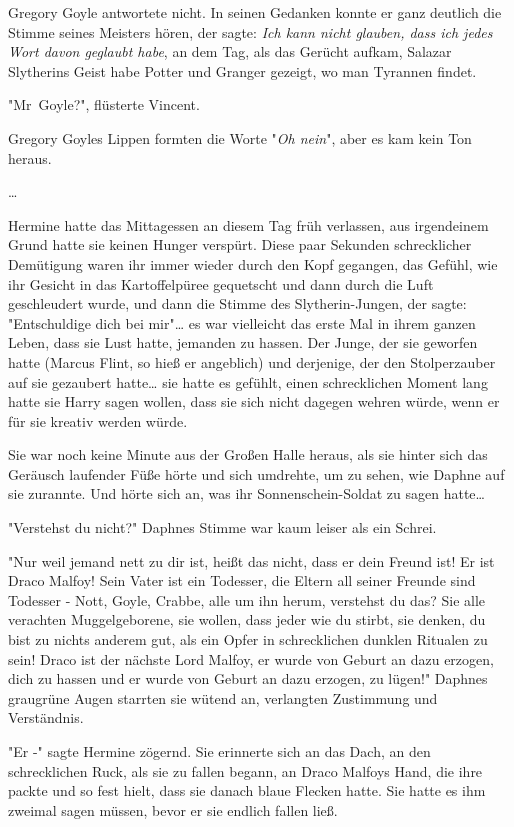 {Gregory Goyle antwortete nicht. In seinen Gedanken konnte er ganz deutlich die Stimme seines Meisters hören, der sagte: \emph{Ich kann nicht glauben, dass ich jedes Wort davon geglaubt habe}, an dem Tag, als das Gerücht aufkam, Salazar Slytherins Geist habe Potter und Granger gezeigt, wo man Tyrannen findet.

"Mr~Goyle?", flüsterte Vincent.

Gregory Goyles Lippen formten die Worte "\emph{Oh nein}", aber es kam kein Ton heraus.

…

Hermine hatte das Mittagessen an diesem Tag früh verlassen, aus irgendeinem Grund hatte sie keinen Hunger verspürt. Diese paar Sekunden schrecklicher Demütigung waren ihr immer wieder durch den Kopf gegangen, das Gefühl, wie ihr Gesicht in das Kartoffelpüree gequetscht und dann durch die Luft geschleudert wurde, und dann die Stimme des Slytherin-Jungen, der sagte: "Entschuldige dich bei mir"… es war vielleicht das erste Mal in ihrem ganzen Leben, dass sie Lust hatte, jemanden zu hassen. Der Junge, der sie geworfen hatte (Marcus Flint, so hieß er angeblich) und derjenige, der den Stolperzauber auf sie gezaubert hatte… sie hatte es gefühlt, einen schrecklichen Moment lang hatte sie Harry sagen wollen, dass sie sich nicht dagegen wehren würde, wenn er für sie kreativ werden würde.

Sie war noch keine Minute aus der Großen Halle heraus, als sie hinter sich das Geräusch laufender Füße hörte und sich umdrehte, um zu sehen, wie Daphne auf sie zurannte. Und hörte sich an, was ihr Sonnenschein-Soldat zu sagen hatte…

"Verstehst du nicht?" Daphnes Stimme war kaum leiser als ein Schrei.

"Nur weil jemand nett zu dir ist, heißt das nicht, dass er dein Freund ist! Er ist Draco Malfoy! Sein Vater ist ein Todesser, die Eltern all seiner Freunde sind Todesser - Nott, Goyle, Crabbe, alle um ihn herum, verstehst du das? Sie alle verachten Muggelgeborene, sie wollen, dass jeder wie du stirbt, sie denken, du bist zu nichts anderem gut, als ein Opfer in schrecklichen dunklen Ritualen zu sein! Draco ist der nächste Lord Malfoy, er wurde von Geburt an dazu erzogen, dich zu hassen und er wurde von Geburt an dazu erzogen, zu lügen!" Daphnes graugrüne Augen starrten sie wütend an, verlangten Zustimmung und Verständnis.

"Er -" sagte Hermine zögernd. Sie erinnerte sich an das Dach, an den schrecklichen Ruck, als sie zu fallen begann, an Draco Malfoys Hand, die ihre packte und so fest hielt, dass sie danach blaue Flecken hatte. Sie hatte es ihm zweimal sagen müssen, bevor er sie endlich fallen ließ.

}
